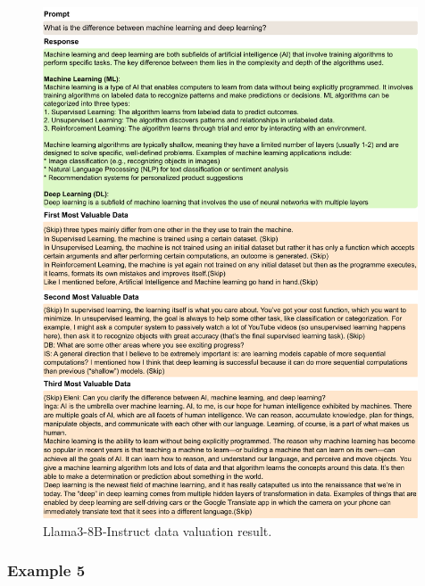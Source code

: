 \begin{figure}[htbp]
    \centering
    \includegraphics[width=0.99\textwidth]{figures/llama3_appendix4.pdf}
    \caption{Llama3-8B-Instruct data valuation result.}
\end{figure}

\clearpage
\subsubsection{Example 5}

